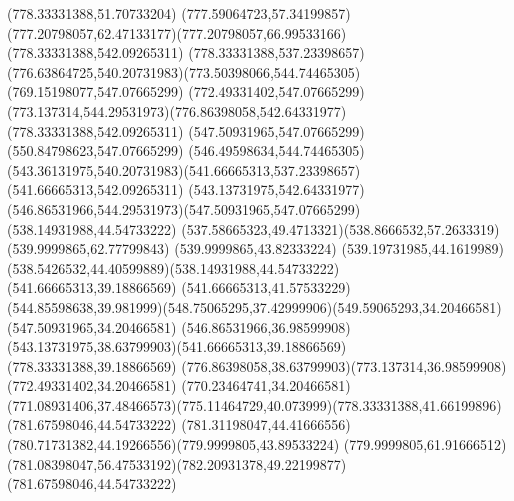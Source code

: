 {{		\lineto(778.33331388,51.70733204)
		\curveto(777.59064723,57.34199857)(777.20798057,62.47133177)(777.20798057,66.99533166)
		\closepath
		\moveto(778.33331388,542.09265311)
		\lineto(778.33331388,537.23398657)
		\curveto(776.63864725,540.20731983)(773.50398066,544.74465305)(769.15198077,547.07665299)
		\lineto(772.49331402,547.07665299)
		\curveto(773.137314,544.29531973)(776.86398058,542.64331977)(778.33331388,542.09265311)
		\moveto(547.50931965,547.07665299)
		\lineto(550.84798623,547.07665299)
		\curveto(546.49598634,544.74465305)(543.36131975,540.20731983)(541.66665313,537.23398657)
		\lineto(541.66665313,542.09265311)
		\curveto(543.13731975,542.64331977)(546.86531966,544.29531973)(547.50931965,547.07665299)
		\moveto(538.14931988,44.54733222)
		\curveto(537.58665323,49.4713321)(538.8666532,57.2633319)(539.9999865,62.77799843)
		\lineto(539.9999865,43.82333224)
		\curveto(539.19731985,44.1619989)(538.5426532,44.40599889)(538.14931988,44.54733222)
		\moveto(541.66665313,39.18866569)
		\lineto(541.66665313,41.57533229)
		\curveto(544.85598638,39.981999)(548.75065295,37.42999906)(549.59065293,34.20466581)
		\lineto(547.50931965,34.20466581)
		\curveto(546.86531966,36.98599908)(543.13731975,38.63799903)(541.66665313,39.18866569)
		\moveto(778.33331388,39.18866569)
		\curveto(776.86398058,38.63799903)(773.137314,36.98599908)(772.49331402,34.20466581)
		\lineto(770.23464741,34.20466581)
		\curveto(771.08931406,37.48466573)(775.11464729,40.073999)(778.33331388,41.66199896)
		\closepath
		\moveto(781.67598046,44.54733222)
		\curveto(781.31198047,44.41666556)(780.71731382,44.19266556)(779.9999805,43.89533224)
		\lineto(779.9999805,61.91666512)
		\curveto(781.08398047,56.47533192)(782.20931378,49.22199877)(781.67598046,44.54733222)
	}
}
